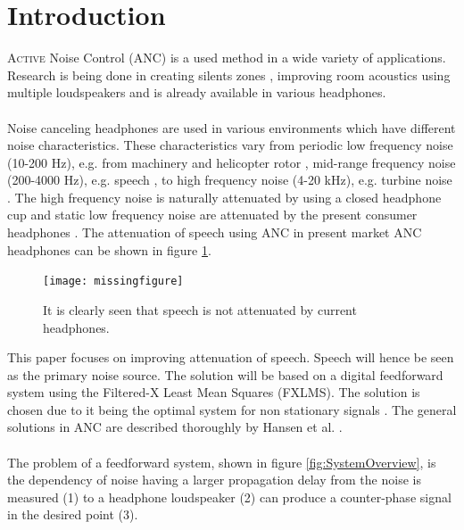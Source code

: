 \section*{Introduction}
\lettrine[lines=2]{A}{ctive} Noise Control (ANC) is a used method in a wide variety of applications. Research is being done in creating silents zones \cite{SilentZones}, improving room acoustics using multiple loudspeakers \cite{CAPS} and is already available in various headphones.
\\\\
Noise canceling headphones are used in various environments which have different noise characteristics. These characteristics vary from periodic low frequency noise (10-200 Hz), e.g. from machinery and helicopter rotor \cite{LowFrequency}, mid-range frequency noise (200-4000 Hz), e.g. speech \cite{MidFrequency}, to high frequency noise (4-20 kHz), e.g. turbine noise \cite{LowFrequency}. The high frequency noise is naturally attenuated by using a closed headphone cup \cite{naturalAttenuation} and static low frequency noise are attenuated by the present consumer headphones \cite{naturalAttenuation}. The attenuation of speech using ANC in present market ANC headphones can be shown in figure \ref{fig:ANCcompare}.

\begin{figure}[H]
	\centering
	\texttt{[image: missingfigure]}
	\caption{It is clearly seen that speech is not attenuated by current headphones.}
	\label{fig:ANCcompare}
\end{figure}


This paper focuses on improving attenuation of speech. Speech will hence be seen as the primary noise source. The solution will be based on a digital feedforward system using the Filtered-X Least Mean Squares (FXLMS). The solution is chosen due to it being the optimal system for non stationary signals \cite{Hansen2}. The general solutions in ANC are described thoroughly by Hansen et al. \cite{Hansen}.
\\\\
The problem of a feedforward system, shown in figure \ref{fig:SystemOverview}, is the dependency of noise having a larger propagation delay from the noise is measured (1) to a headphone loudspeaker (2) can produce a counter-phase signal in the desired point (3). 

